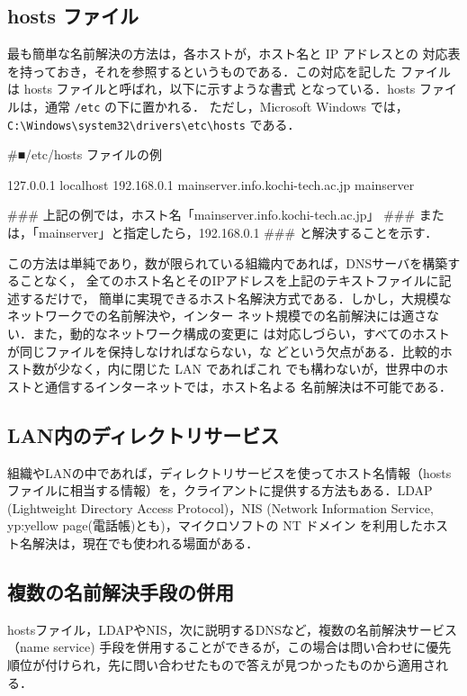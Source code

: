 \subsection*{hosts ファイル}
最も簡単な名前解決の方法は，各ホストが，ホスト名と IP アドレスとの
対応表を持っておき，それを参照するというものである．この対応を記した
ファイルは hosts ファイルと呼ばれ，以下に示すような書式
となっている．hosts ファイルは，通常 \texttt{/etc} の下に置かれる．
ただし，Microsoft Windows では，
\verb|C:\Windows\system32\drivers\etc\hosts| である．


\begin{cli}
#■/etc/hosts ファイルの例

127.0.0.1    localhost
192.168.0.1  mainserver.info.kochi-tech.ac.jp  mainserver

### 上記の例では，ホスト名「mainserver.info.kochi-tech.ac.jp」
### または，「mainserver」と指定したら，192.168.0.1
### と解決することを示す．
\end{cli}

この方法は単純であり，数が限られている組織内であれば，DNSサーバを構築することなく，
全てのホスト名とそのIPアドレスを上記のテキストファイルに記述するだけで，
簡単に実現できるホスト名解決方式である．しかし，大規模なネットワークでの名前解決や，インター
ネット規模での名前解決には適さない．また，動的なネットワーク構成の変更に
は対応しづらい，すべてのホストが同じファイルを保持しなければならない，な
どという欠点がある．比較的ホスト数が少なく，内に閉じた LAN であればこれ
でも構わないが，世界中のホストと通信するインターネットでは，ホスト名よる
名前解決は不可能である．

\subsection*{LAN内のディレクトリサービス}

組織やLANの中であれば，ディレクトリサービスを使ってホスト名情報（hostsファイルに相当する情報）を，クライアントに提供する方法もある．LDAP (Lightweight Directory Access Protocol)，NIS (Network Information Service, yp:yellow page(電話帳)とも)，マイクロソフトの NT ドメイン を利用したホスト名解決は，現在でも使われる場面がある．

\subsection*{複数の名前解決手段の併用}

hostsファイル，LDAPやNIS，次に説明するDNSなど，複数の名前解決サービス（name service) 手段を併用することができるが，この場合は問い合わせに優先順位が付けられ，先に問い合わせたもので答えが見つかったものから適用される．

